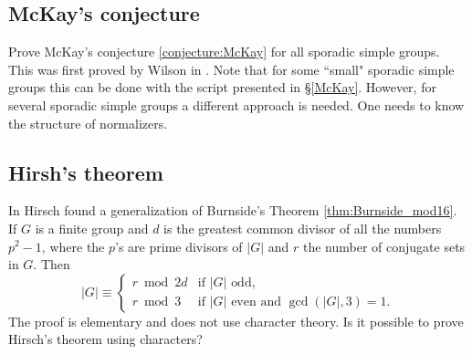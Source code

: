 


\subsection*{McKay's conjecture}

Prove McKay's conjecture \ref{conjecture:McKay} for all sporadic simple groups. 
This was first proved by Wilson in \cite{MR1643110}. 
Note that
for some ``small" sporadic simple groups this can be done
with the script presented in \S\ref{McKay}. However, 
for several sporadic simple groups a different approach is needed. One needs
to know the structure of normalizers. 




\subsection*{Hirsh's theorem}

In \cite{MR36755} Hirsch found a generalization of Burnside's Theorem \ref{thm:Burnside_mod16}.  
If $G$ is a finite group and $d$ is the greatest common divisor of all 
the numbers $p^2-1$, where the $p$'s are prime divisors of $|G|$ and $r$ the number of conjugate sets in $G$. Then 
\[
|G|\equiv\begin{cases} 
    r\bmod 2d &\text{if $|G|$ odd,}\\
    r\bmod 3 & \text{if $|G|$ even and $\gcd(|G|,3)=1$.}
    \end{cases}
\]
The proof is elementary and does not use character theory. Is it possible
to prove Hirsch's theorem using characters?

